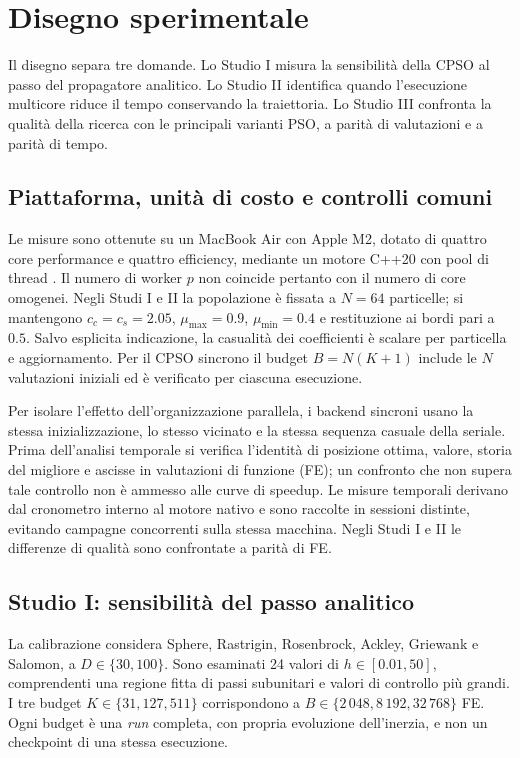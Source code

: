 \section{Disegno sperimentale}\label{sec:exp}

Il disegno separa tre domande. Lo Studio I misura la sensibilità della CPSO al passo del propagatore analitico. Lo Studio II identifica quando l'esecuzione multicore riduce il tempo conservando la traiettoria. Lo Studio III confronta la qualità della ricerca con le principali varianti PSO, a parità di valutazioni e a parità di tempo.

\subsection{Piattaforma, unità di costo e controlli comuni}\label{subsec:exp-common}
Le misure sono ottenute su un MacBook Air con Apple M2, dotato di quattro core performance e quattro efficiency, mediante un motore C++20 con pool di thread \citep{AppleM2Specs,AppleM2Design}. Il numero di worker $p$ non coincide pertanto con il numero di core omogenei. Negli Studi I e II la popolazione è fissata a $N=64$ particelle; si mantengono $c_c=c_s=2.05$, $\mu_{\max}=0.9$, $\mu_{\min}=0.4$ e restituzione ai bordi pari a $0.5$. Salvo esplicita indicazione, la casualità dei coefficienti è scalare per particella e aggiornamento. Per il CPSO sincrono il budget $B=N(K+1)$ include le $N$ valutazioni iniziali ed è verificato per ciascuna esecuzione.

Per isolare l'effetto dell'organizzazione parallela, i backend sincroni usano la stessa inizializzazione, lo stesso vicinato e la stessa sequenza casuale della seriale. Prima dell'analisi temporale si verifica l'identità di posizione ottima, valore, storia del migliore e ascisse in valutazioni di funzione (FE); un confronto che non supera tale controllo non è ammesso alle curve di speedup. Le misure temporali derivano dal cronometro interno al motore nativo e sono raccolte in sessioni distinte, evitando campagne concorrenti sulla stessa macchina. Negli Studi I e II le differenze di qualità sono confrontate a parità di FE.

\subsection{Studio I: sensibilità del passo analitico}\label{subsec:exp-dt}
La calibrazione considera Sphere, Rastrigin, Rosenbrock, Ackley, Griewank e Salomon, a $D\in\{30,100\}$. Sono esaminati 24 valori di $h\in[0.01,50]$, comprendenti una regione fitta di passi subunitari e valori di controllo più grandi. I tre budget $K\in\{31,127,511\}$ corrispondono a $B\in\{2\,048,8\,192,32\,768\}$ FE. Ogni budget è una \emph{run} completa, con propria evoluzione dell'inerzia, e non un checkpoint di una stessa esecuzione.

